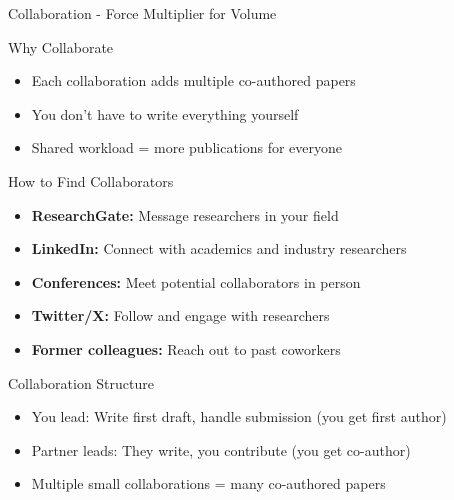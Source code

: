 \documentclass[11pt]{beamer}
\begin{document}
	\begin{frame}{Collaboration - Force Multiplier for Volume}
		\scriptsize
		\begin{block}{Why Collaborate}
			\begin{itemize}
				\item Each collaboration adds multiple co-authored papers
				\item You don't have to write everything yourself
				\item Shared workload = more publications for everyone
			\end{itemize}
		\end{block}
		\begin{block}{How to Find Collaborators}
			\begin{itemize}
				\item \textbf{ResearchGate:} Message researchers in your field
				\item \textbf{LinkedIn:} Connect with academics and industry researchers
				\item \textbf{Conferences:} Meet potential collaborators in person
				\item \textbf{Twitter/X:} Follow and engage with researchers
				\item \textbf{Former colleagues:} Reach out to past coworkers
			\end{itemize}
		\end{block}
		\begin{block}{Collaboration Structure}
			\begin{itemize}
				\item You lead: Write first draft, handle submission (you get first author)
				\item Partner leads: They write, you contribute (you get co-author)
				\item Multiple small collaborations = many co-authored papers
			\end{itemize}
		\end{block}
	\end{frame}
	
\end{document}
